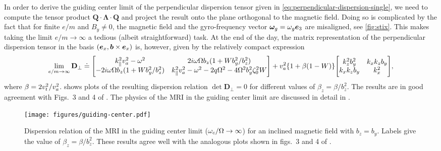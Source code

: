 \documentclass[aps,pre,notitlepage,amsmath,amssymb,amsfonts,nobibnotes,nofootinbib]{revtex4-1}
\begin{document}
In order to derive the guiding center limit of the perpendicular dispersion
tensor given in \cref{eq:perpendicular-dispersion-single}, we need to compute
the tensor product $\mathbf{Q}\cdot\mathbf{\Lambda}\cdot\mathbf{Q}$ and
project the result onto the plane orthogonal to the magnetic field. Doing so
is complicated by the fact that for finite $e/m$ and $B_y\ne{}0$, the magnetic
field and the gyro-frequency vector $\bm{\omega}_g=\omega_g\bm{e}_3$ are misaligned, see
\cref{fig:stix}. This makes taking the limit $e/m\to\infty$ a tedious (albeit
straightforward) task. At the end of the day, the matrix representation of the
perpendicular dispersion tensor 
in the basis $(\bm{e}_x,\bm{b}\times\bm{e}_x)$ is, however, given by the relatively
compact expression
\begingroup
\renewcommand*{\arraystretch}{1.4}
\begin{equation}
  \label{eq:DRguiding}
  \lim_{e/m\to\infty}\mathbf{D}_\perp \doteq
  \Bigg[\begin{matrix}
    k_\parallel^2\va^2 - \omega^2
    & 2i\omega\Omega b_z (1 + Wb_y^2/b_z^2) \\
    - 2i\omega\Omega b_z (1 + Wb_y^2/b_z^2)
    & k_\parallel^2\va^2 - \omega^2 - 2q\Omega^2 - 4\Omega^2b_y^2\zeta_0^2W
  \end{matrix}\Bigg]
  + \va^2\{1 + \beta(1-W)\}
  \Bigg[\begin{matrix}
    k_z^2 b_y^2 & k_x k_z b_y \\
    k_x k_z b_y & k_x^2
  \end{matrix}\Bigg],
\end{equation}
\endgroup
where $\beta=2v_t^2/v_a^2$.  shows plots of the
resulting dispersion relation $\det\mathbf{D}_\perp=0$ for different values of
$\beta_z=\beta/b_z^2$. The results are in good agreement with Figs.~3 and 4 of
\citet{Quataert2002}. The physics of the MRI in the guiding center limit are
discussed in detail in \citet{Quataert2002} \citep[see also][]{Balbus2004}.

\begin{figure}
  \centering\texttt{[image: figures/guiding-center.pdf]}
  \caption{Dispersion relation of the MRI in the guiding center limit
    ($\omega_c/\Omega\to\infty$) for an inclined magnetic field with $b_z=b_y$.
    Labels give the value of $\beta_z=\beta/b_z^2$. These results agree well
    with the analogous plots shown in figs.~3 and 4 of
    \citet{Quataert2002}.}\label{fig:guiding-center}
\end{figure}
\end{document}

